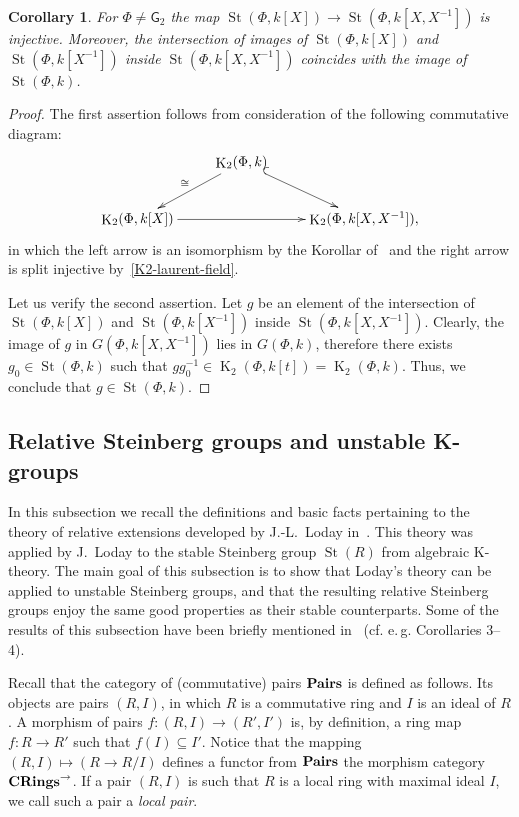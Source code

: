 \documentclass[oneside, 8pt]{amsart}
\newtheorem{corollary}[lemma]{Corollary}
\theoremstyle{remark}
\theoremstyle{definition}
\numberwithin{lemma}{section}
\numberwithin{prop}{section}
\numberwithin{corollary}{section}
\numberwithin{externaltheorem}{section}
\DeclareMathOperator{\St}{St}
\DeclareMathOperator{\K}{K}
\newcommand{\inv}{^{-1}}
\newcommand{\catname}[1]{{\normalfont\textbf{#1}}} %
\newcommand{\rG}{\mathsf{G}}
\numberwithin{equation}{section}
\begin{document}
\begin{corollary} \label{field-injectivity} For $\Phi\neq\rG_2$ the map $\St(\Phi, k[X]) \to \St(\Phi, k[X, X^{-1}])$ is injective. Moreover, the intersection of images of $\St(\Phi, k[X])$ and $\St(\Phi, k[X\inv])$ inside $\St(\Phi, k[X, X\inv])$ coincides with the image of $\St(\Phi, k)$. \end{corollary}
\begin{proof} The first assertion follows from consideration of the following commutative diagram:
\[\xymatrix{ & \K_2(\Phi, k) \ar[dl]_{\cong} \ar@{^{(}->}[dr] & \\
               \K_2(\Phi, k[X]) \ar[rr] &               & \K_2(\Phi, k[X, X^{-1}]),} \]
in which the left arrow is an isomorphism by the Korollar of~\cite[Satz~1]{Re75} and the right arrow is split injective by~\cref{K2-laurent-field}. 

Let us verify the second assertion. Let $g$ be an element of the intersection of $\St(\Phi, k[X])$ and $\St(\Phi, k[X\inv])$ inside $\St(\Phi, k[X, X\inv])$.
Clearly, the image of $g$ in $G(\Phi, k[X, X\inv])$ lies in $G(\Phi, k)$, therefore there exists $g_0 \in \St(\Phi, k)$ such that $gg_0^{-1} \in \K_2(\Phi, k[t]) = \K_2(\Phi, k)$. Thus, we conclude that $g \in \St(\Phi, k)$.
\end{proof}

\subsection{Relative Steinberg groups and unstable K-groups} \label{sec:quillen}
In this subsection we recall the definitions and basic facts pertaining to the theory of relative extensions developed by J.-L.~Loday in~\cite{Lo78}. This theory was applied by J.~Loday to the stable Steinberg group $\St(R)$ from algebraic K-theory. The main goal of this subsection is to show that Loday's theory can be applied to unstable Steinberg groups, and that the resulting relative Steinberg groups enjoy the same good properties as their stable counterparts.
Some of the results of this subsection have been briefly mentioned in~\cite{S15} (cf. e.\,g. Corollaries 3--4).

Recall that the category of (commutative) pairs $\catname{Pairs}$ is defined as follows.
Its objects are pairs $(R, I)$, in which $R$ is a commutative ring and $I$ is an ideal of $R$. A morphism of pairs $f \colon (R, I) \to (R', I')$ is, by definition, a ring map $f \colon R \to R'$ such that $f(I) \subseteq I'$. Notice that the mapping $(R, I) \mapsto (R \to R/I)$ defines a functor from $\catname{Pairs}$ the morphism category $\catname{CRings}^\rightarrow$.
If a pair $(R, I)$ is such that $R$ is a local ring with maximal ideal $I$, we call such a pair a {\it local pair}.
\end{document}
